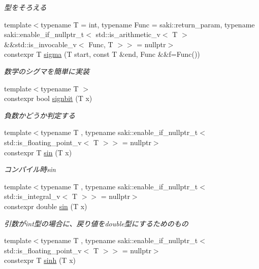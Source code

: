 \begin{DoxyCompactItemize}
\begin{DoxyCompactList}\small\item\em 型をそろえる \end{DoxyCompactList}\item 
{\footnotesize template$<$typename T  = int, typename Func  = saki\+::return\+\_\+param, typename saki\+::enable\+\_\+if\+\_\+nullptr\+\_\+t$<$ std\+::is\+\_\+arithmetic\+\_\+v$<$ T $>$ \&\&std\+::is\+\_\+invocable\+\_\+v$<$ Func, T $>$$>$  = nullptr$>$ }\\constexpr T \mbox{\hyperlink{namespacesaki_ac51e06f83630682641e0d99d5c957a9c}{sigma}} (T start, const T \&end, Func \&\&f=Func())
\begin{DoxyCompactList}\small\item\em 数学のシグマを簡単に実装 \end{DoxyCompactList}\item 
{\footnotesize template$<$typename T $>$ }\\constexpr bool \mbox{\hyperlink{namespacesaki_a2e595e3d1c68d48646e3fe481cda4fe0}{signbit}} (T x)
\begin{DoxyCompactList}\small\item\em 負数かどうか判定する \end{DoxyCompactList}\item 
{\footnotesize template$<$typename T , typename saki\+::enable\+\_\+if\+\_\+nullptr\+\_\+t$<$ std\+::is\+\_\+floating\+\_\+point\+\_\+v$<$ T $>$$>$  = nullptr$>$ }\\constexpr T \mbox{\hyperlink{namespacesaki_a743f7284cdebb6406db9b37e42bcd730}{sin}} (T x)
\begin{DoxyCompactList}\small\item\em コンパイル時sin \end{DoxyCompactList}\item 
{\footnotesize template$<$typename T , typename saki\+::enable\+\_\+if\+\_\+nullptr\+\_\+t$<$ std\+::is\+\_\+integral\+\_\+v$<$ T $>$$>$  = nullptr$>$ }\\constexpr double \mbox{\hyperlink{namespacesaki_a9fd77d1e52189e28f4a5d069891501cf}{sin}} (T x)
\begin{DoxyCompactList}\small\item\em 引数がint型の場合に、戻り値をdouble型にするためのもの \end{DoxyCompactList}\item 
{\footnotesize template$<$typename T , typename saki\+::enable\+\_\+if\+\_\+nullptr\+\_\+t$<$ std\+::is\+\_\+floating\+\_\+point\+\_\+v$<$ T $>$$>$  = nullptr$>$ }\\constexpr T \mbox{\hyperlink{namespacesaki_abe1ef6db83d59a5eb2daac9bff09d312}{sinh}} (T x)

\end{DoxyCompactItemize}
